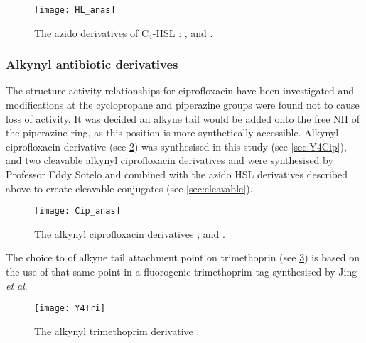 \begin{figure}[H]
	\begin{center}
		\texttt{[image: HL\_anas]}
		\caption{The azido derivatives of C$_4$-HSL :  ,  and . \label{fig:HL_anas}}
	\end{center}
\end{figure}


\subsubsection{Alkynyl antibiotic derivatives}


The structure-activity relationships for ciprofloxacin have been investigated \cite{Renau1996} and modifications at the cyclopropane and piperazine groups were found not to cause loss of activity. It was decided an alkyne tail would be added onto the free NH of the piperazine ring, as this position is more synthetically accessible. 
Alkynyl ciprofloxacin derivative  (see \ref{fgr:Cip_anas}) was synthesised in this study (see \ref{sec:Y4Cip}), and two cleavable alkynyl ciprofloxacin derivatives  and  were synthesised by Professor Eddy Sotelo and combined with the azido HSL derivatives described above to create cleavable conjugates (see \ref{sec:cleavable}).


\begin{figure}[H]
	\begin{center}
		\texttt{[image: Cip\_anas]}
		\caption{The alkynyl ciprofloxacin derivatives ,  and . \label{fgr:Cip_anas}}
	\end{center}
\end{figure}

The choice to of alkyne tail attachment point on trimethoprin  (see \ref{fgr:Y4Tri}) is based on the use of that same point in a fluorogenic trimethoprim tag synthesised by Jing \textit{et al}\cite{Jing2013}.

\begin{figure}[H]
	\begin{center}
		\texttt{[image: Y4Tri]}
		\caption{The alkynyl trimethoprim derivative . \label{fgr:Y4Tri}}
	\end{center}
\end{figure}

